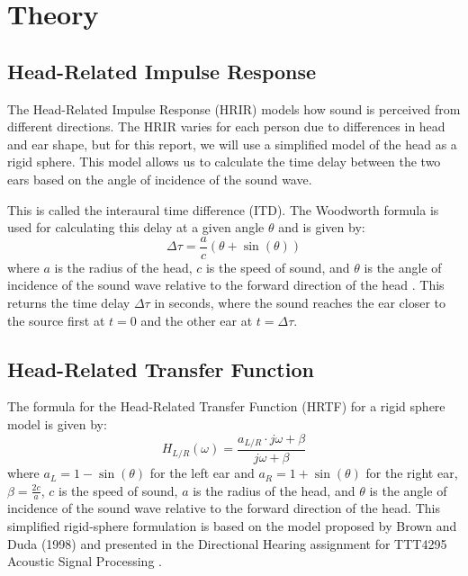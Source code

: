 \chapter{Theory}

\section{Head-Related Impulse Response}
\label{sec:hrir}

The Head-Related Impulse Response (HRIR) models how sound is perceived from different directions. The HRIR varies for each person due to differences in head and ear shape, but for this report, we will use a simplified model of the head as a rigid sphere. This model allows us to calculate the time delay between the two ears based on the angle of incidence of the sound wave.

This is called the interaural time difference (ITD). The Woodworth formula is used for calculating this delay at a given angle \( \theta \) and is given by:
\begin{equation}
  \Delta\tau = \frac{a}{c} (\theta + \sin(\theta))
  \label{eq:woodworth}
\end{equation}
where \( a \) is the radius of the head, \( c \) is the speed of sound, and \( \theta \) is the angle of incidence of the sound wave relative to the forward direction of the head \cite{svensson2024compendium}. This returns the time delay \( \Delta\tau \) in seconds, where the sound reaches the ear closer to the source first at \( t = 0 \) and the other ear at \( t = \Delta\tau \).

\section{Head-Related Transfer Function}
\label{sec:hrtf}

The formula for the Head-Related Transfer Function (HRTF) for a rigid sphere model is given by:
\begin{equation}
  H_{L/R}(\omega) = \frac{a_{L/R} \cdot j\omega + \beta}{j\omega + \beta} 
  \label{eq:hrtf}
\end{equation}
where \( a_{L} = 1 - \sin(\theta) \) for the left ear and \( a_{R} = 1 + \sin(\theta) \) for the right ear, \( \beta = \frac{2c}{a} \), \( c \) is the speed of sound, \( a \) is the radius of the head, and \( \theta \) is the angle of incidence of the sound wave relative to the forward direction of the head. This simplified rigid-sphere formulation is based on the model proposed by Brown and Duda (1998) and presented in the Directional Hearing assignment for TTT4295 Acoustic Signal Processing \cite{Svensson2025}.

